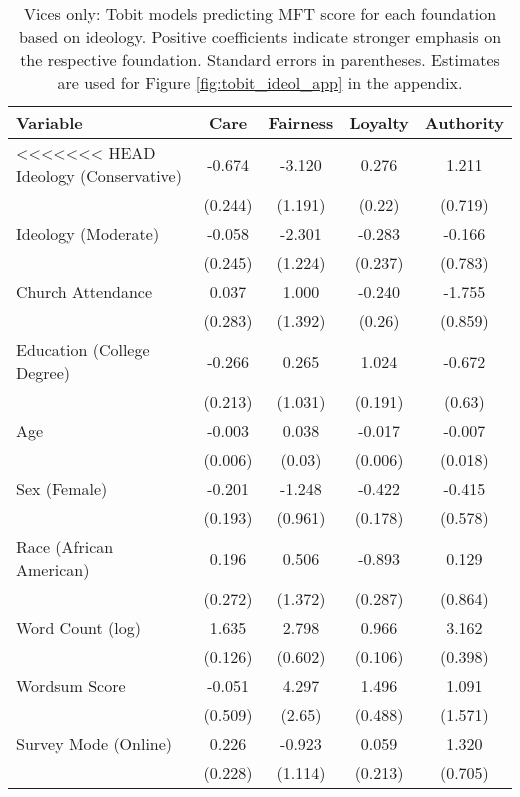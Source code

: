 \begin{table}[ht]
\centering
\caption{Vices only: Tobit models predicting MFT score for each foundation based 
           on ideology. Positive coefficients indicate stronger emphasis on the respective 
           foundation. Standard errors in parentheses. Estimates are used for 
           Figure \ref{fig:tobit_ideol_app} in the appendix.} 
\label{tab:tobit_vice}
\begingroup\footnotesize
\begin{tabular}{lcccc}
  \hline
Variable & Care & Fairness & Loyalty & Authority \\ 
  \hline
<<<<<<< HEAD
Ideology (Conservative) &  -0.674 &  -3.120 &  0.276 &   1.211 \\ 
   & (0.244) & (1.191) & (0.22) & (0.719) \\ 
  Ideology (Moderate) &  -0.058 &  -2.301 & -0.283 &  -0.166 \\ 
   & (0.245) & (1.224) & (0.237) & (0.783) \\ 
  Church Attendance &   0.037 &   1.000 & -0.240 &  -1.755 \\ 
   & (0.283) & (1.392) & (0.26) & (0.859) \\ 
  Education (College Degree) &  -0.266 &   0.265 &  1.024 &  -0.672 \\ 
   & (0.213) & (1.031) & (0.191) & (0.63) \\ 
  Age &  -0.003 &   0.038 & -0.017 &  -0.007 \\ 
   & (0.006) & (0.03) & (0.006) & (0.018) \\ 
  Sex (Female) &  -0.201 &  -1.248 & -0.422 &  -0.415 \\ 
   & (0.193) & (0.961) & (0.178) & (0.578) \\ 
  Race (African American) &   0.196 &   0.506 & -0.893 &   0.129 \\ 
   & (0.272) & (1.372) & (0.287) & (0.864) \\ 
  Word Count (log) &   1.635 &   2.798 &  0.966 &   3.162 \\ 
   & (0.126) & (0.602) & (0.106) & (0.398) \\ 
  Wordsum Score &  -0.051 &   4.297 &  1.496 &   1.091 \\ 
   & (0.509) & (2.65) & (0.488) & (1.571) \\ 
  Survey Mode (Online) &   0.226 &  -0.923 &  0.059 &   1.320 \\ 
   & (0.228) & (1.114) & (0.213) & (0.705) \\ 

\end{tabular}
\end{table}
